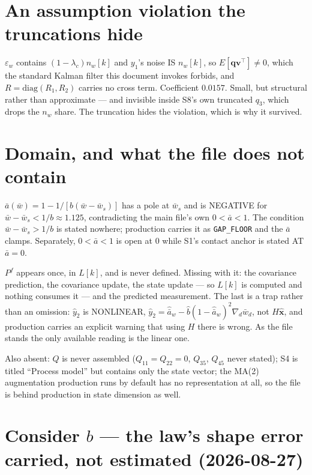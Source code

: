 \documentclass[11pt,a4paper,fontset=none]{ctexart}
\newcommand{\ba}{\bar{a}}
\newcommand{\bw}{\bar{w}}
\begin{document}
\section*{An assumption violation the truncations hide}

$\varepsilon_w$ contains $(1-\lambda_c)n_w[k]$ and $y_1$'s noise IS $n_w[k]$, so
$E[\mathbf{q}\mathbf{v}^{\top}] \neq 0$, which the standard Kalman filter this
document invokes forbids, and $R = \mathrm{diag}(R_1,R_2)$ carries no cross
term. Coefficient $0.0157$. Small, but structural rather than approximate --- and
invisible inside S8's own truncated $q_3$, which drops the $n_w$ share. The
truncation hides the violation, which is why it survived.

\section*{Domain, and what the file does not contain}

$\ba(\bw) = 1 - 1/[b(\bw-\bw_s)]$ has a pole at $\bw_s$ and is NEGATIVE for
$\bw - \bw_s < 1/b \approx 1.125$, contradicting the main file's own
$0 < \ba < 1$. The condition $\bw - \bw_s > 1/b$ is stated nowhere; production
carries it as \texttt{GAP\_FLOOR} and the $\ba$ clamps. Separately, $0 < \ba < 1$
is open at 0 while S1's contact anchor is stated AT $\ba = 0$.

$P^{f}$ appears once, in $L[k]$, and is never defined. Missing with it: the
covariance prediction, the covariance update, the state update --- so $L[k]$ is
computed and nothing consumes it --- and the predicted measurement. The last is a
trap rather than an omission: $\hat{y}_2$ is NONLINEAR,
$\hat{y}_2 = \hat{\ba}_w - \hat{b}(1-\hat{\ba}_w)^{2}\nabla_d\bw_d$, not
$H\hat{\mathbf{x}}$, and production carries an explicit warning that using $H$
there is wrong. As the file stands the only available reading is the linear one.

Also absent: $Q$ is never assembled ($Q_{11} = Q_{22} = 0$, $Q_{35}$, $Q_{45}$
never stated); S4 is titled ``Process model'' but contains only the state vector;
the MA(2) augmentation production runs by default has no representation at all,
so the file is behind production in state dimension as well.

\section*{Consider $b$ --- the law's shape error carried, not estimated (2026-08-27)}
\end{document}
